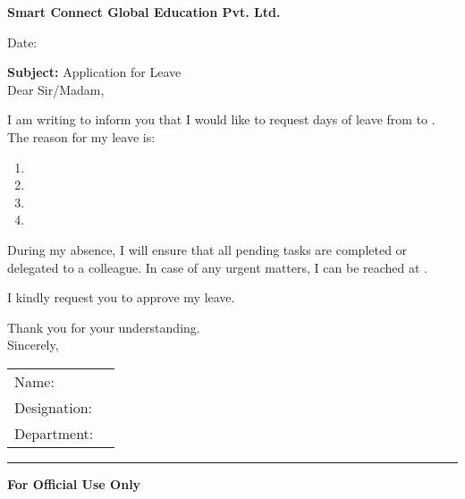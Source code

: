 \documentclass[11pt,a4paper]{article}
\begin{document}
\begin{center}
    \textbf{\Large Smart Connect Global Education Pvt. Ltd.}
\end{center}

\noindent
\begin{flushright}
    Date: \underline{\hspace{5cm}}
\end{flushright}

\noindent
\textbf{Subject:} Application for Leave\\[0.8em]

Dear Sir/Madam,

I am writing to inform you that I would like to request \underline{\hspace{2cm}} days of leave from \underline{\hspace{3cm}} to \underline{\hspace{3cm}}. The reason for my leave is:

\begin{enumerate}[leftmargin=1.5em]
    \item \hrulefill
    \item \hrulefill
    \item \hrulefill
    \item \hrulefill
\end{enumerate}

During my absence, I will ensure that all pending tasks are completed or delegated to a colleague. In case of any urgent matters, I can be reached at \underline{\hspace{4cm}}.

I kindly request you to approve my leave.

Thank you for your understanding.\\[0.5em]

Sincerely,

\noindent
\begin{tabular}{l l}
Name: & \underline{\hspace{5cm}} \\[0.7em]
Designation: & \underline{\hspace{5cm}} \\[0.7em]
Department: & \underline{\hspace{5cm}}
\end{tabular}

\vspace{0.8em}
\hrule
\vspace{0.8em}
\textbf{For Official Use Only}\\[0.5em]
\end{document}
